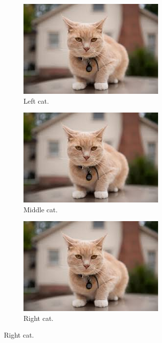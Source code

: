 \documentclass[times, utf8, diplomski]{fer}
\begin{document}
\begin{figure}[ht!]

  \centering
  \begin{subfigure}[b]{0.2\linewidth}
    \includegraphics[width=\linewidth]{images/cat.jpg}
     \caption{Left cat.}
  \end{subfigure}
  \begin{subfigure}[b]{0.2\linewidth}
    \includegraphics[width=\linewidth]{images/cat.jpg}
    \caption{Middle cat.}
  \end{subfigure}
  \begin{subfigure}[b]{0.2\linewidth}
    \includegraphics[width=\linewidth]{images/cat.jpg}
    \caption{Right cat.}
  \end{subfigure}


\end{figure}
\end{document}
